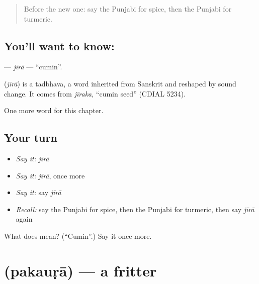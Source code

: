 \label{lesson:PA-C125-jira}



\begin{quote}
Before the new one: say the Punjabi for spice, then the Punjabi for turmeric.
\end{quote}

\subsection*{You'll want to know: }
\textbf{} — \emph{jīrā} — \textquotedblleft{}cumin\textquotedblright{}.

\begin{cousinweb}
\textbf{} (\emph{jīrā}) is a tadbhava, a word inherited from Sanskrit and reshaped by sound change. It comes from \emph{jīraka}, \textquotedblleft{}cumin seed\textquotedblright{} (CDIAL 5234).
\end{cousinweb}

\begin{grammarlens}[title={What you've built}]
One more word for this chapter.
\end{grammarlens}

\subsection*{Your turn}
\begin{itemize}
\raggedright
  \item \emph{Say it:} \emph{jīrā}
  \item \emph{Say it:} \emph{jīrā}, once more
  \item \emph{Say it:} say \emph{jīrā}
  \item \emph{Recall:} say the Punjabi for spice, then the Punjabi for turmeric, then say \emph{jīrā} again
\end{itemize}

\begin{tcolorbox}[breakable,colback=teal!4,colframe=teal!35!black,title={Before you move on}]
What does  mean? (\textquotedblleft{}Cumin\textquotedblright{}.) Say it once more.
\end{tcolorbox}
\section[\texorpdfstring{\pa{ਪਕੌੜਾ} (pakauṛā)}{ਪਕੌੜਾ (pakauṛā)}]{ (pakauṛā) — a fritter}

\label{lesson:PA-C125-pakaura}



